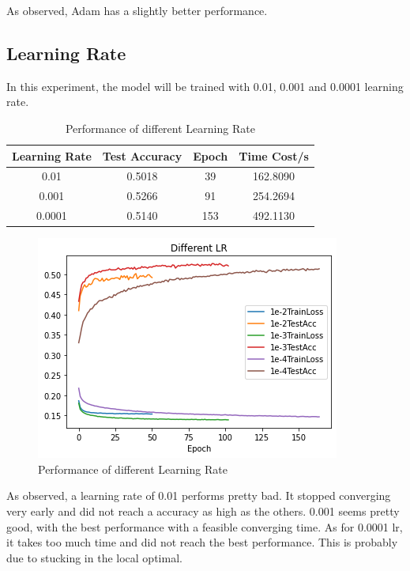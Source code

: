 \documentclass{article}[12pt]
\begin{document}
    As observed, Adam has a slightly better performance.

\subsection{Learning Rate}

    In this experiment, the model will be trained with 0.01, 0.001 and 0.0001 learning rate.

\begin{table}[H]\label{tab:table}
    \centering
    \begin{tabular}{|c|c|c|c|}
        \hline
        Learning Rate & Test Accuracy & Epoch & Time Cost/s\\\hline
        0.01 & 0.5018 & 39 & 162.8090\\\hline
        0.001 & 0.5266 & 91 & 254.2694\\\hline
        0.0001 & 0.5140 & 153 & 492.1130\\\hline
    \end{tabular}
    \caption{Performance of different Learning Rate}
\end{table}

\begin{figure}[H]
    \centering
    \includegraphics[scale=0.5]{Figures/5.LR/download}
    \caption{Performance of different Learning Rate}
\end{figure}

    As observed, a learning rate of 0.01 performs pretty bad. It stopped converging
    very early and did not reach a accuracy as high as the others.
    0.001 seems pretty good, with the best performance with a feasible converging time.
    As for 0.0001 lr, it takes too much time and did not reach the best performance.
    This is probably due to stucking in the local optimal.
\end{document}
